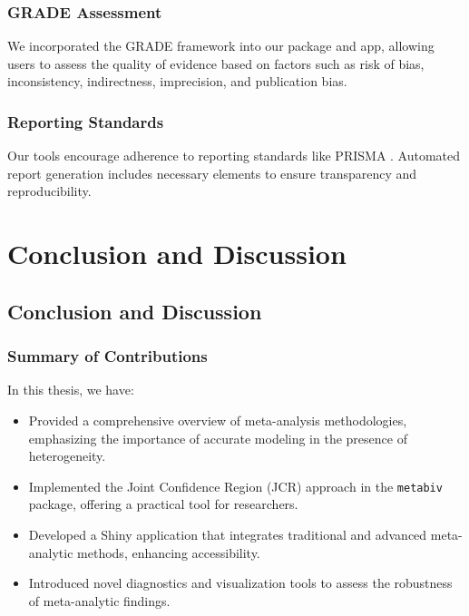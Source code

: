\documentclass[12pt,a4paper]{report}
\begin{document}
\section{GRADE Assessment}
\label{sec:grade_assessment}

We incorporated the GRADE framework \citep{guyatt2008} into our package and app, allowing users to assess the quality of evidence based on factors such as risk of bias, inconsistency, indirectness, imprecision, and publication bias.

\section{Reporting Standards}
\label{sec:reporting_standards}

Our tools encourage adherence to reporting standards like PRISMA \citep{moher2009}. Automated report generation includes necessary elements to ensure transparency and reproducibility.

\part{Conclusion and Discussion}
\label{part:conclusion}

\chapter{Conclusion and Discussion}
\label{chap:conclusion_discussion}

\section{Summary of Contributions}
\label{sec:summary_contributions}

In this thesis, we have:

\begin{itemize}
    \item Provided a comprehensive overview of meta-analysis methodologies, emphasizing the importance of accurate modeling in the presence of heterogeneity.
    \item Implemented the Joint Confidence Region (JCR) approach in the \texttt{metabiv} package, offering a practical tool for researchers.
    \item Developed a Shiny application that integrates traditional and advanced meta-analytic methods, enhancing accessibility.
    \item Introduced novel diagnostics and visualization tools to assess the robustness of meta-analytic findings.
\end{itemize}
\end{document}
